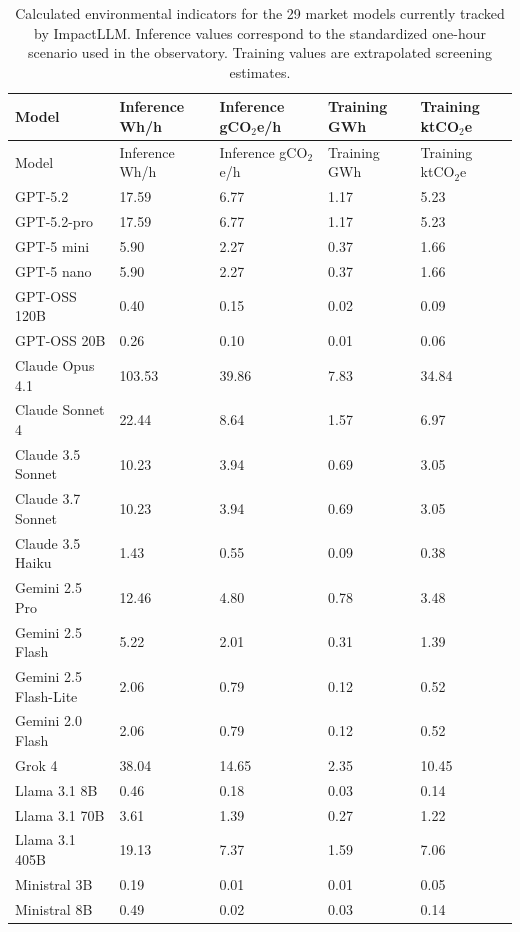 \documentclass[10pt,a4paper]{article}
\begin{document}
\begin{longtable}{|L{4.0cm}|L{2.0cm}|L{2.2cm}|L{1.7cm}|L{1.8cm}|}
\caption{Calculated environmental indicators for the 29 market models currently tracked by ImpactLLM. Inference values correspond to the standardized one-hour scenario used in the observatory. Training values are extrapolated screening estimates.}\label{tab:catalog-results}\\
\hline
Model & Inference Wh/h & Inference gCO$_2$e/h & Training GWh & Training ktCO$_2$e \\
\hline
\endfirsthead
\hline
Model & Inference Wh/h & Inference gCO$_2$e/h & Training GWh & Training ktCO$_2$e \\
\hline
\endhead
\hline
GPT-5.2 & 17.59 & 6.77 & 1.17 & 5.23 \\
\hline
GPT-5.2-pro & 17.59 & 6.77 & 1.17 & 5.23 \\
\hline
GPT-5 mini & 5.90 & 2.27 & 0.37 & 1.66 \\
\hline
GPT-5 nano & 5.90 & 2.27 & 0.37 & 1.66 \\
\hline
GPT-OSS 120B & 0.40 & 0.15 & 0.02 & 0.09 \\
\hline
GPT-OSS 20B & 0.26 & 0.10 & 0.01 & 0.06 \\
\hline
Claude Opus 4.1 & 103.53 & 39.86 & 7.83 & 34.84 \\
\hline
Claude Sonnet 4 & 22.44 & 8.64 & 1.57 & 6.97 \\
\hline
Claude 3.5 Sonnet & 10.23 & 3.94 & 0.69 & 3.05 \\
\hline
Claude 3.7 Sonnet & 10.23 & 3.94 & 0.69 & 3.05 \\
\hline
Claude 3.5 Haiku & 1.43 & 0.55 & 0.09 & 0.38 \\
\hline
Gemini 2.5 Pro & 12.46 & 4.80 & 0.78 & 3.48 \\
\hline
Gemini 2.5 Flash & 5.22 & 2.01 & 0.31 & 1.39 \\
\hline
Gemini 2.5 Flash-Lite & 2.06 & 0.79 & 0.12 & 0.52 \\
\hline
Gemini 2.0 Flash & 2.06 & 0.79 & 0.12 & 0.52 \\
\hline
Grok 4 & 38.04 & 14.65 & 2.35 & 10.45 \\
\hline
Llama 3.1 8B & 0.46 & 0.18 & 0.03 & 0.14 \\
\hline
Llama 3.1 70B & 3.61 & 1.39 & 0.27 & 1.22 \\
\hline
Llama 3.1 405B & 19.13 & 7.37 & 1.59 & 7.06 \\
\hline
Ministral 3B & 0.19 & 0.01 & 0.01 & 0.05 \\
\hline
Ministral 8B & 0.49 & 0.02 & 0.03 & 0.14 \\

\end{longtable}
\end{document}
